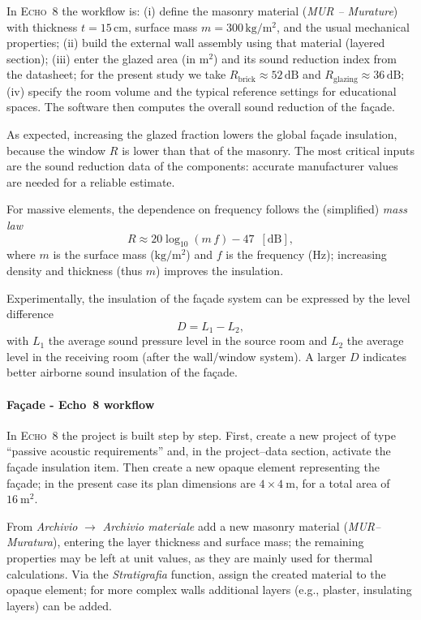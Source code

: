 In \textsc{Echo~8} the workflow is:
(i) define the masonry material (\emph{MUR – Murature}) with thickness
\(t=15\,\mathrm{cm}\), surface mass \(m=300\,\mathrm{kg/m^2}\), and the usual
mechanical properties;
(ii) build the external wall assembly using that material (layered section);
(iii) enter the glazed area (in \(\mathrm{m^2}\)) and its sound reduction
index from the datasheet; for the present study we take
\(R_{\text{brick}}\approx 52\,\mathrm{dB}\) and
\(R_{\text{glazing}}\approx 36\,\mathrm{dB}\);
(iv) specify the room volume and the typical reference settings for
educational spaces. The software then computes the overall sound reduction of
the façade.

As expected, increasing the glazed fraction lowers the global façade
insulation, because the window \(R\) is lower than that of the masonry. The
most critical inputs are the sound reduction data of the components:
accurate manufacturer values are needed for a reliable estimate. 

For massive
elements, the dependence on frequency follows the (simplified) \emph{mass
law}
\[
R \approx 20\log_{10}(m\,f)-47\ \;[\mathrm{dB}],
\]
where \(m\) is the surface mass (\(\mathrm{kg/m^2}\)) and \(f\) is the
frequency (\(\mathrm{Hz}\)); increasing density and thickness (thus \(m\))
improves the insulation.

Experimentally, the insulation of the façade system can be expressed by the
level difference
\[
D = L_1 - L_2,
\]
with \(L_1\) the average sound pressure level in the source room and \(L_2\)
the average level in the receiving room (after the wall/window system). A
larger \(D\) indicates better airborne sound insulation of the façade.


\paragraph{Façade - Echo~8 workflow}

In \textsc{Echo~8} the project is built step by step. First, create a new project of type ``passive acoustic requirements'' and, in the project–data section, activate the façade insulation item. Then create a new opaque element representing the façade; in the present case its plan dimensions are \(4\times 4~\mathrm{m}\), for a total area of \(16~\mathrm{m^2}\).

From \textit{Archivio} \(\rightarrow\) \textit{Archivio materiale} add a new masonry material (\textit{MUR–Muratura}), entering the layer thickness and surface mass; the remaining properties may be left at unit values, as they are mainly used for thermal calculations. Via the \textit{Stratigrafia} function, assign the created material to the opaque element; for more complex walls additional layers (e.g., plaster, insulating layers) can be added.

